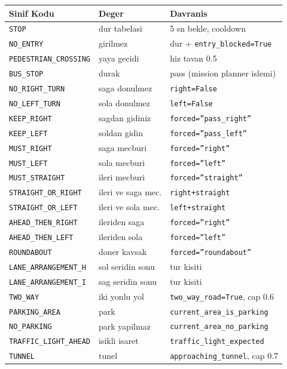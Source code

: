 \documentclass[a4paper,12pt]{article}
\begin{document}
\begin{center}
\renewcommand{\arraystretch}{1.15}
\begin{longtable}{llp{5.0cm}}
  \toprule
  Sinif Kodu                   & Deger               & Davranis\\
  \midrule
  \endhead
  \texttt{STOP}                & dur tabelasi        & 5 sn bekle, cooldown\\
  \texttt{NO\_ENTRY}           & girilmez            & dur + \texttt{entry\_blocked=True}\\
  \texttt{PEDESTRIAN\_CROSSING}& yaya gecidi         & hiz tavan 0.5\\
  \texttt{BUS\_STOP}           & durak               & pass (mission planner islemi)\\
  \texttt{NO\_RIGHT\_TURN}     & saga donulmez       & \texttt{right=False}\\
  \texttt{NO\_LEFT\_TURN}      & sola donulmez       & \texttt{left=False}\\
  \texttt{KEEP\_RIGHT}         & sagdan gidiniz      & \texttt{forced=''pass\_right''}\\
  \texttt{KEEP\_LEFT}          & soldan gidin        & \texttt{forced=''pass\_left''}\\
  \texttt{MUST\_RIGHT}         & saga mecburi        & \texttt{forced=''right''}\\
  \texttt{MUST\_LEFT}          & sola mecburi        & \texttt{forced=''left''}\\
  \texttt{MUST\_STRAIGHT}      & ileri mecburi       & \texttt{forced=''straight''}\\
  \texttt{STRAIGHT\_OR\_RIGHT} & ileri ve saga mec.  & \texttt{right+straight}\\
  \texttt{STRAIGHT\_OR\_LEFT}  & ileri ve sola mec.  & \texttt{left+straight}\\
  \texttt{AHEAD\_THEN\_RIGHT}  & ileriden saga       & \texttt{forced=''right''}\\
  \texttt{AHEAD\_THEN\_LEFT}   & ileriden sola       & \texttt{forced=''left''}\\
  \texttt{ROUNDABOUT}          & doner kavsak        & \texttt{forced=''roundabout''}\\
  \texttt{LANE\_ARRANGEMENT\_H}& sol seridin sonu    & tur kisiti\\
  \texttt{LANE\_ARRANGEMENT\_I}& sag seridin sonu    & tur kisiti\\
  \texttt{TWO\_WAY}            & iki yonlu yol       & \texttt{two\_way\_road=True}, cap 0.6\\
  \texttt{PARKING\_AREA}       & park                & \texttt{current\_area\_is\_parking}\\
  \texttt{NO\_PARKING}         & park yapilmaz       & \texttt{current\_area\_no\_parking}\\
  \texttt{TRAFFIC\_LIGHT\_AHEAD}& isikli isaret      & \texttt{traffic\_light\_expected}\\
  \texttt{TUNNEL}              & tunel               & \texttt{approaching\_tunnel}, cap 0.7\\
  \bottomrule
\end{longtable}
\end{center}
\end{document}
